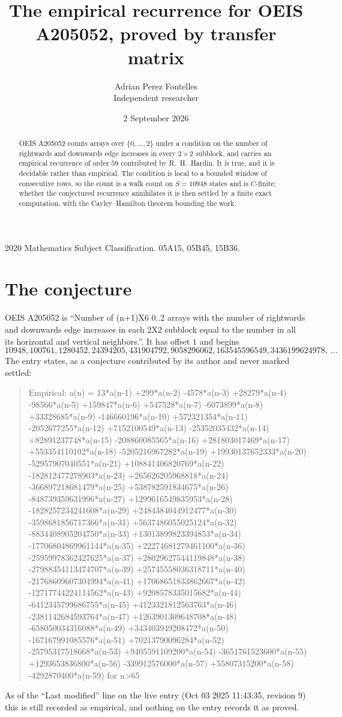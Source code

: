 \documentclass[11pt,a4paper]{article}
\title{The empirical recurrence for OEIS A205052, proved by transfer matrix}
\author{Adrian Perez Fontelles\\ \small Independent researcher}
\date{2 September 2026}
\theoremstyle{plain}
\theoremstyle{definition}
\begin{document}
\maketitle

\begin{abstract}
OEIS A205052 counts arrays over $\{0,\dots,2\}$ under a condition on the number of rightwards and downwards edge increases
in every $2\times2$ subblock, and carries an empirical recurrence of order $59$ contributed by
R.~H.~Hardin. It is true, and it is decidable rather than empirical. The condition is local to
a bounded window of consecutive rows, so the count is a walk count on $S=10948$ states and is
$C$-finite; whether the conjectured recurrence annihilates it is then settled by a finite exact
computation, with the Cayley--Hamilton theorem bounding the work.
\end{abstract}

\noindent\small 2020 Mathematics Subject Classification. 05A15, 05B45, 15B36.\normalsize

\section{The conjecture}

OEIS A205052 is ``Number of (n+1)X6 0..2 arrays with the number of rightwards and downwards edge increases in each 2X2 subblock equal to the number in all its horizontal and vertical neighbors.''. It has offset $1$ and begins
\[
10948, 100761, 1280452, 24394205, 431904792, 9058296062, 163545596549, 3436199624978,\ \dots
\]
The entry states, as a conjecture contributed by its author and never marked settled:
\begin{quote}
Empirical: a(n) = 13*a(n-1) +299*a(n-2) -4578*a(n-3) +28279*a(n-4) -98566*a(n-5) +159847*a(n-6) +547528*a(n-7) -6073899*a(n-8) +33328685*a(n-9) -146660196*a(n-10) +572321354*a(n-11) -2052677255*a(n-12) +7152100549*a(n-13) -25352035432*a(n-14) +82891237748*a(n-15) -208860085565*a(n-16) +281803017469*a(n-17) +553354110102*a(n-18) -5205216967282*a(n-19) +19930137652333*a(n-20) -52957907040551*a(n-21) +108841406820769*a(n-22) -182812477278903*a(n-23) +265626205968818*a(n-24) -366897218681479*a(n-25) +538782591834675*a(n-26) -848739359631996*a(n-27) +1299616549835953*a(n-28) -1828257234241608*a(n-29) +2484384044912477*a(n-30) -3598681856717366*a(n-31) +5637486055025124*a(n-32) -8834408905204750*a(n-33) +13013899823394853*a(n-34) -17706804869961144*a(n-35) +22274681279461100*a(n-36) -25959978362427625*a(n-37) +28029627544119848*a(n-38) -27988354113474707*a(n-39) +25745558036318711*a(n-40) -21768609607304994*a(n-41) +17068651833862667*a(n-42) -12717744224114562*a(n-43) +9208578335015682*a(n-44) -6412345799686755*a(n-45) +4123321812563763*a(n-46) -2381142684593764*a(n-47) +1263901309648708*a(n-48) -658050034316088*a(n-49) +343403949208472*a(n-50) -167167991085576*a(n-51) +70213790096284*a(n-52) -25795317518668*a(n-53) +9405591109200*a(n-54) -3651761523600*a(n-55) +1293653836800*a(n-56) -339912576000*a(n-57) +55807315200*a(n-58) -4292870400*a(n-59) for n>65
\end{quote}
As of the ``Last modified'' line on the live entry (Oct 03 2025 11:43:35, revision 9) this is still
recorded as empirical, and nothing on the entry records it as proved.
\end{document}
